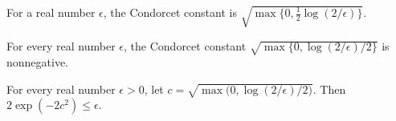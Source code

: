 \begin{definition}
\label{FABL.condorcetConstant}
\leanok
For a real number $\epsilon$, the Condorcet constant is
$\sqrt{\max\{0,\tfrac12\log(2/\epsilon)\}}$.
\end{definition}

\begin{theorem}
\label{FABL.condorcetConstant_nonneg}
\leanok
{}
For every real number $\epsilon$, the Condorcet constant
$\sqrt{\max\{0,\log(2/\epsilon)/2\}}$ is nonnegative.
\end{theorem}

\begin{theorem}
\label{FABL.two_mul_exp_neg_two_mul_condorcetConstant_sq_le}
\leanok
{}
For every real number $\epsilon>0$, let $c=\sqrt{\max\bigl(0,\log(2/\epsilon)/2\bigr)}$.
Then $2\exp(-2c^2)\leq\epsilon$.
\end{theorem}

